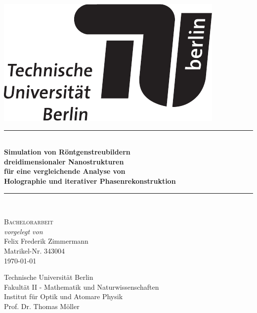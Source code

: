 \begin{titlepage}
		
	\begin{center}
				
				
		\begin{flushright}
			\includegraphics[width=.3\textwidth]{images/TU_Logo.pdf}\\[2.5cm]    
			\end{flushright}
					
					
			{\newcommand{\HRule}{\rule{\linewidth}{0.5mm}}
				\HRule \\[0.4cm]
				\LARGE{\bfseries Simulation von Röntgenstreubildern\\ dreidimensionaler Nanostrukturen\\ für eine vergleichende Analyse von\\ Holographie und iterativer Phasenrekonstruktion}\\
							
				\HRule \\[1.5cm]}
			\textsc{\Large Bachelorarbeit}\\[0.5cm]
					
			\emph{vorgelegt von}\\
			Felix Frederik Zimmermann\\
			Matrikel-Nr. 343004\\[0.5cm]
			{\large \today}
					
					
			\vfill
					
			Technische Universität Berlin\\
			Fakultät II - Mathematik und Naturwissenschaften\\
			Institut für Optik und Atomare Physik\\
			Prof. Dr. Thomas Möller\\
					
		\end{center}
			
	\end{titlepage}